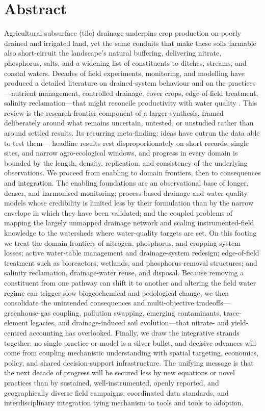 \section{Abstract}

Agricultural subsurface (tile) drainage underpins crop production on poorly drained and irrigated land, yet the same conduits that make these soils farmable also short-circuit the landscape's natural buffering, delivering nitrate, phosphorus, salts, and a widening list of constituents to ditches, streams, and coastal waters. Decades of field experiments, monitoring, and modelling have produced a detailed literature on drained-system behaviour and on the practices---nutrient management, controlled drainage, cover crops, edge-of-field treatment, salinity reclamation---that might reconcile productivity with water quality \parencite{Randall2001}. This review is the research-frontier component of a larger synthesis, framed deliberately around what remains uncertain, untested, or unstudied rather than around settled results. Its recurring meta-finding: ideas have outrun the data able to test them--- headline results rest disproportionately on short records, single sites, and narrow agro-ecological windows, and progress in every domain is bounded by the length, density, replication, and consistency of the underlying observations. We proceed from enabling to domain frontiers, then to consequences and integration. The enabling foundations are an observational base of longer, denser, and harmonised monitoring; process-based drainage and water-quality models whose credibility is limited less by their formulation than by the narrow envelope in which they have been validated; and the coupled problems of mapping the largely unmapped drainage network and scaling instrumented-field knowledge to the watersheds where water-quality targets are set. On this footing we treat the domain frontiers of nitrogen, phosphorus, and cropping-system losses; active water-table management and drainage-system redesign; edge-of-field treatment such as bioreactors, wetlands, and phosphorus-removal structures; and salinity reclamation, drainage-water reuse, and disposal. Because removing a constituent from one pathway can shift it to another and altering the field water regime can trigger slow biogeochemical and pedological change, we then consolidate the unintended consequences and multi-objective tradeoffs---greenhouse-gas coupling, pollution swapping, emerging contaminants, trace-element legacies, and drainage-induced soil evolution---that nitrate- and yield-centred accounting has overlooked. Finally, we draw the integrative strands together: no single practice or model is a silver bullet, and decisive advances will come from coupling mechanistic understanding with spatial targeting, economics, policy, and shared decision-support infrastructure. The unifying message is that the next decade of progress will be secured less by new equations or novel practices than by sustained, well-instrumented, openly reported, and geographically diverse field campaigns, coordinated data standards, and interdisciplinary integration tying mechanism to tools and tools to adoption.
